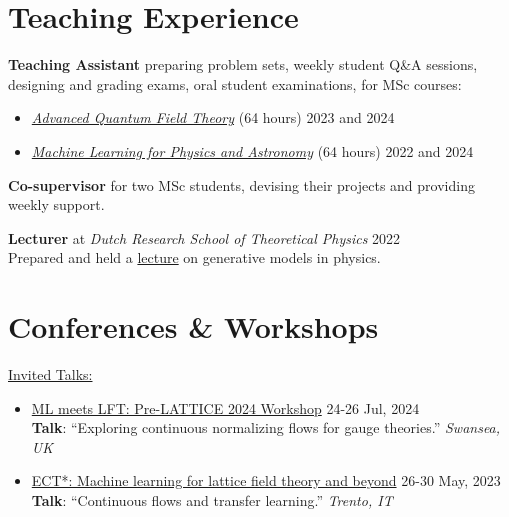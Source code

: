 \documentclass[11pt]{article}
\newcommand{\dateright}[1]{\hfill{\small\color{accentblue} #1}}
\begin{document}
\section*{Teaching Experience}
\noindent
\textbf{Teaching Assistant} preparing problem sets, weekly student Q\&A sessions, designing and grading exams, oral student examinations, for MSc courses:
\begin{itemize}
    \item \href{https://coursecatalogue.uva.nl/xmlpages/page/2023-2024-en/search-course/course/109196}{\textit{Advanced Quantum Field Theory}} (64 hours) \dateright{2023 and 2024}
    \item \href{https://coursecatalogue.uva.nl/xmlpages/page/2022-2023-en/search-course/course/99394}{\textit{Machine Learning for Physics and Astronomy}} (64 hours) \dateright{2022 and 2024}
\end{itemize}

\vspace{0.2cm}
\noindent
\textbf{Co-supervisor} for two MSc students, devising their projects and providing weekly support.

\vspace{0.2cm}
\noindent
\textbf{Lecturer} at \textit{Dutch Research School of Theoretical Physics} \dateright{2022} \\
Prepared and held a \href{https://www.drstp.nl/wp-content/uploads/2022/06/THEP-Schedule-2022.pdf}{lecture} on generative models in physics.

\section*{Conferences \& Workshops}
\underline{Invited Talks:}
\begin{itemize}[left=0pt, itemsep=3.5pt]
    \item {\href{http://pyweb.swan.ac.uk/~aarts/ml-lft-2024-programme.html}{ML meets LFT: Pre-LATTICE 2024 Workshop}} \dateright{ 24-26 Jul, 2024} \\
    {\footnotesize \textbf{Talk}: “Exploring continuous normalizing flows for gauge theories.”} \dateright{{\color{black}\textit{Swansea, UK}}}

    \item {\href{https://indico.ectstar.eu/event/171/contributions/3849/}{ECT*: Machine learning for lattice field theory and beyond}} \dateright{ 26-30 May, 2023} \\
    {\footnotesize \textbf{Talk}: “Continuous flows and transfer learning.”} \dateright{{\color{black}\textit{Trento, IT}}}
\end{itemize}
\end{document}
